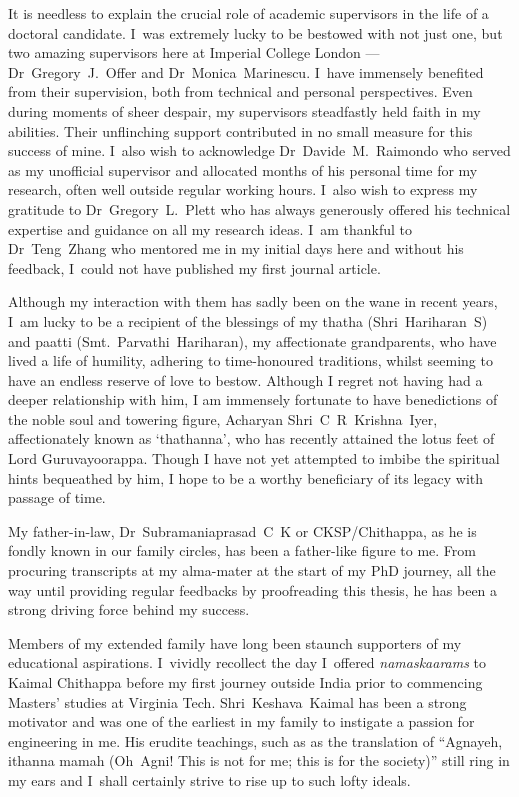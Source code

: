 
It is needless to explain the crucial role of academic supervisors in the life
of a doctoral candidate. I~was extremely lucky to be bestowed with not just one,
but two amazing supervisors here at Imperial College London --- \mbox{Dr Gregory
J.\ Offer} and \mbox{Dr Monica Marinescu}. I~have immensely benefited from their
supervision, both from technical and personal perspectives. Even during moments
of sheer despair, my supervisors steadfastly held faith in my abilities. Their
unflinching support contributed in no small measure for this success of mine.
I~also wish to acknowledge \mbox{Dr Davide M.\ Raimondo} who served as my
unofficial supervisor and allocated months of his personal time for my research,
often well outside regular working hours. I~also wish to express my gratitude to
\mbox{Dr Gregory L.\ Plett} who has always generously offered his technical
expertise and guidance on all my research ideas. I~am thankful to \mbox{Dr Teng
Zhang} who mentored me in my initial days here and without his feedback, I~could
not have published my first journal article.

Although my interaction with them has sadly been on the wane in recent years,
I~am lucky to be a recipient of the blessings of my thatha \mbox{(Shri~Hariharan
S)} and paatti \mbox{(Smt.\ Parvathi Hariharan)}, my affectionate grandparents,
who have lived a life of humility, adhering to time-honoured traditions, whilst
seeming to have an endless reserve of love to bestow. Although I regret not
having had a deeper relationship with him, I am immensely fortunate  to have
benedictions of the noble soul and towering figure, Acharyan \mbox{Shri C R
Krishna Iyer}, affectionately known as `thathanna', who has recently attained
the lotus feet of Lord Guruvayoorappa. Though I have not yet attempted to imbibe
the spiritual hints bequeathed by him, I hope to be a worthy beneficiary of its
legacy with passage of time.

My father-in-law, \mbox{Dr Subramaniaprasad C K} or CKSP/Chithappa, as he is
fondly known in our family circles, has been a father-like figure to me. From
procuring transcripts at my alma-mater at the start of my PhD journey, all the
way until providing regular feedbacks by proofreading this thesis, he has been a
strong driving force behind my success.

Members of my extended family have long been staunch supporters of my
educational aspirations. I~vividly recollect the day I~offered
\emph{namaskaarams} to Kaimal Chithappa before my first journey outside India
prior to commencing Masters' studies at Virginia Tech. \mbox{Shri~Keshava
Kaimal} has been a strong motivator and was one of the earliest in my family to
instigate a passion for engineering in me. His erudite teachings, such as as the
translation of  \enquote{Agnayeh, ithanna mamah (Oh~Agni! This is not for me;
this is for the society)} still ring in my ears and I~shall certainly strive to
rise up to such lofty ideals.

